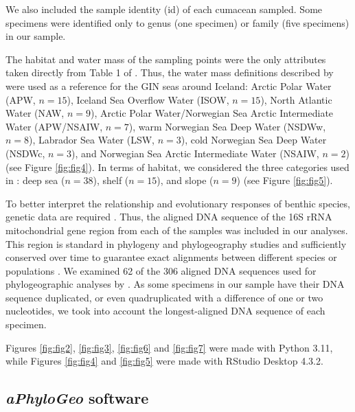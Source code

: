 We also included the sample identity (id) of each cumacean sampled. Some specimens were identified only to genus (one specimen) or family (five specimens) in our sample.
 
The habitat and water mass of the sampling points were the only attributes taken directly from Table 1 of \citep{uhlir_adding_2021}. Thus, the water mass definitions described by \citep{hansen_north_2000, brix2010distribution, ostmann_marine_2014} were used as a reference for the GIN seas around Iceland: Arctic Polar Water (APW, $n=15$), Iceland Sea Overflow Water (ISOW, $n=15$), North Atlantic Water (NAW, $n=9$), Arctic Polar Water/Norwegian Sea Arctic Intermediate Water (APW/NSAIW, $n=7$), warm Norwegian Sea Deep Water (NSDWw, $n=8$), Labrador Sea Water (LSW, $n=3$), cold Norwegian Sea Deep Water (NSDWc, $n=3$), and Norwegian Sea Arctic Intermediate Water (NSAIW, $n=2$) (see Figure \ref{fig:fig4}). In terms of habitat, we considered the three categories used in \citep{uhlir_adding_2021}: deep sea ($n=38$), shelf ($n=15$), and slope ($n=9$) (see Figure \ref{fig:fig5}).

To better interpret the relationship and evolutionary responses of benthic species, genetic data are required \citep{wilson_speciation_1987, uhlir_adding_2021}. Thus, the aligned DNA sequence of the 16S rRNA mitochondrial gene region from each of the samples was included in our analyses. This region is standard in phylogeny and phylogeography studies \citep{hugenholtz1998impact} and sufficiently conserved over time to guarantee exact alignments between different species or populations \citep{saccone1999evolutionary}. We examined 62 of the 306 aligned DNA sequences used for phylogeographic analyses by \citep{uhlir_adding_2021}. As some specimens in our sample have their DNA sequence duplicated, or even quadruplicated with a difference of one or two nucleotides, we took into account the longest-aligned DNA sequence of each specimen.

Figures \ref{fig:fig2}, \ref{fig:fig3}, \ref{fig:fig6} and \ref{fig:fig7} were made with Python 3.11, while Figures \ref{fig:fig4} and \ref{fig:fig5} were made with RStudio Desktop 4.3.2.

\subsection{\textit{aPhyloGeo} software}\label{aPhyloGeo-software}

